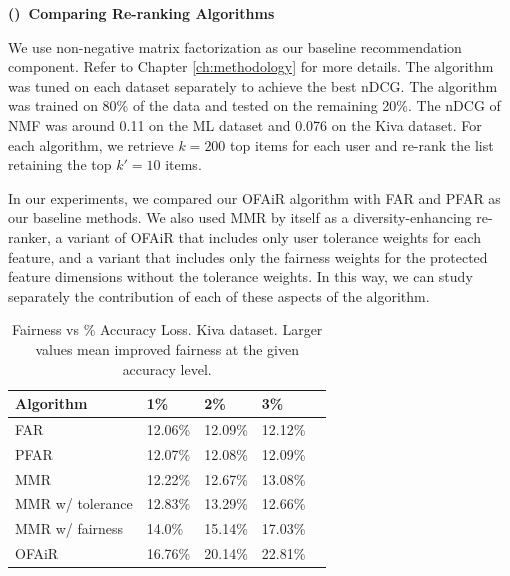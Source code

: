 
\vspace{0.25cm}
\noindent \textbf{()~Comparing Re-ranking Algorithms}
\vspace{0.25cm}

We use non-negative matrix factorization as our baseline recommendation component. Refer to Chapter \ref{ch:methodology} for more details. The algorithm was tuned on each dataset separately to achieve the best nDCG. The algorithm was trained on 80\% of the data and tested on the remaining 20\%. The nDCG of NMF was around 0.11 on the ML dataset and 0.076 on the Kiva dataset.
For each algorithm, we retrieve $k=200$ top items for each user and re-rank the list retaining the top $k'=10$ items.  

In our experiments, we compared our OFAiR algorithm with FAR and PFAR as our baseline methods. We also used MMR by itself as a diversity-enhancing re-ranker, a variant of OFAiR that includes only user tolerance weights for each feature, and a variant that includes only the fairness weights for the protected feature dimensions without the tolerance weights. In this way, we can study separately the contribution of each of these aspects of the algorithm.

\begin{table}[]
\centering
\begin{tabular}{lllll}
 Algorithm &  1\% & 2\% & 3\% \\
 \hline
 FAR & 12.06\% & 12.09\% & 12.12\% \\
 PFAR & 12.07\% & 12.08\% & 12.09\% \\
 MMR &  12.22\% & 12.67\% & 13.08\% \\
 MMR w/ tolerance & 12.83\% & 13.29\% & 12.66\%   \\
 MMR w/ fairness & 14.0\% & 15.14\% & 17.03\%  \\
 OFAiR & 16.76\% & 20.14\% & 22.81\% \\
 \hline
\end{tabular}
\caption{Fairness vs \% Accuracy Loss. Kiva dataset. 
Larger values mean improved fairness at the given accuracy level.}
\label{tbl:kiva_fairness_accuracy_relationship}
\end{table}

